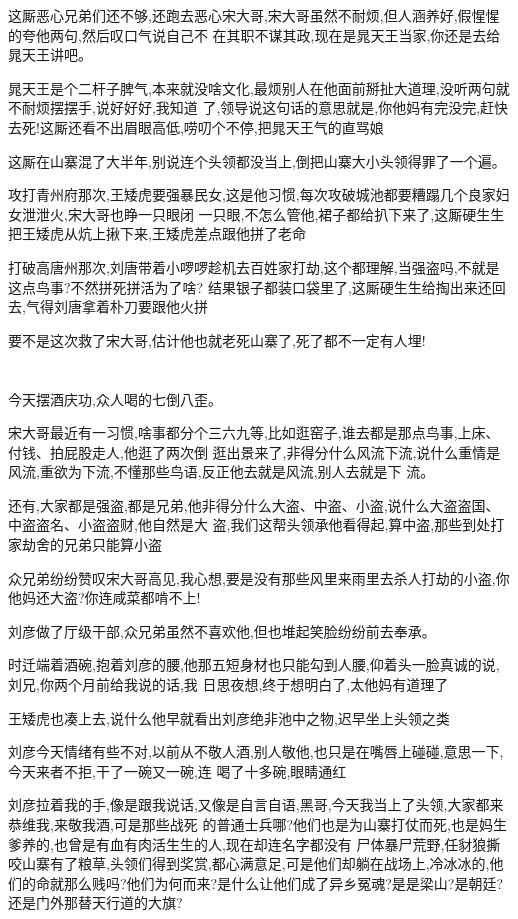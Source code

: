 ﻿\documentclass[12pt]{article}
\begin{document}
这厮恶心兄弟们还不够,还跑去恶心宋大哥,宋大哥虽然不耐烦,但人涵养好,假惺惺的夸他两句,然后叹口气说自己不
在其职不谋其政,现在是晁天王当家,你还是去给晁天王讲吧。

晁天王是个二杆子脾气,本来就没啥文化,最烦别人在他面前掰扯大道理,没听两句就不耐烦摆摆手,说好好好,我知道
了,领导说这句话的意思就是,你他妈有完没完,赶快去死!这厮还看不出眉眼高低,唠叨个不停,把晁天王气的直骂娘

这厮在山寨混了大半年,别说连个头领都没当上,倒把山寨大小头领得罪了一个遍。

攻打青州府那次,王矮虎要强暴民女,这是他习惯,每次攻破城池都要糟蹋几个良家妇女泄泄火,宋大哥也睁一只眼闭
一只眼,不怎么管他,裙子都给扒下来了,这厮硬生生把王矮虎从炕上揪下来,王矮虎差点跟他拼了老命

打破高唐州那次,刘唐带着小啰啰趁机去百姓家打劫,这个都理解,当强盗吗,不就是这点鸟事?不然拼死拼活为了啥?
结果银子都装口袋里了,这厮硬生生给掏出来还回去,气得刘唐拿着朴刀要跟他火拼\dldots

要不是这次救了宋大哥,估计他也就老死山寨了,死了都不一定有人埋!

\section{}

今天摆酒庆功,众人喝的七倒八歪。

宋大哥最近有一习惯,啥事都分个三六九等,比如逛窑子,谁去都是那点鸟事,上床、付钱、拍屁股走人,他逛了两次倒
逛出景来了,非得分什么风流下流,说什么重情是风流,重欲为下流,不懂那些鸟语,反正他去就是风流,别人去就是下
流。

还有,大家都是强盗,都是兄弟,他非得分什么大盗、中盗、小盗,说什么大盗盗国、中盗盗名、小盗盗财,他自然是大
盗,我们这帮头领承他看得起,算中盗,那些到处打家劫舍的兄弟只能算小盗\dldots

众兄弟纷纷赞叹宋大哥高见,我心想,要是没有那些风里来雨里去杀人打劫的小盗,你他妈还大盗?你连咸菜都啃不上!

刘彦做了厅级干部,众兄弟虽然不喜欢他,但也堆起笑脸纷纷前去奉承。

时迁端着酒碗,抱着刘彦的腰,他那五短身材也只能勾到人腰,仰着头一脸真诚的说,刘兄,你两个月前给我说的话,我
日思夜想,终于想明白了,太他妈有道理了

王矮虎也凑上去,说什么他早就看出刘彦绝非池中之物,迟早坐上头领之类\dldots

刘彦今天情绪有些不对,以前从不敬人酒,别人敬他,也只是在嘴唇上碰碰,意思一下,今天来者不拒,干了一碗又一碗,连
喝了十多碗,眼睛通红

刘彦拉着我的手,像是跟我说话,又像是自言自语,黑哥,今天我当上了头领,大家都来恭维我,来敬我酒,可是那些战死
的普通士兵哪?他们也是为山寨打仗而死,也是妈生爹养的,也曾是有血有肉活生生的人,现在却连名字都没有\dldots
尸体暴尸荒野,任豺狼撕咬\dldots 山寨有了粮草,头领们得到奖赏,都心满意足,可是他们却躺在战场上,冷冰冰的,他
们的命就那么贱吗?他们为何而来?是什么让他们成了异乡冤魂?是是梁山?是朝廷?还是门外那替天行道的大旗? 
\end{document}
